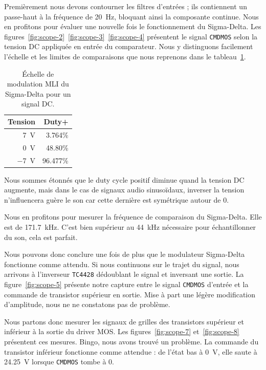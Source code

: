 \documentclass[10pt, oneside, a4paper]{article}
\begin{document}
Premièrement nous devons contourner les filtres d'entrées ; ils contiennent un passe-haut à la fréquence de \SI{20}{\hertz}, bloquant ainsi la composante continue.
Nous en profitons pour évaluer une nouvelle fois le fonctionnement du Sigma-Delta.
Les figures~\ref{fig:scope-2}~\ref{fig:scope-3}~\ref{fig:scope-4} présentent le signal \texttt{CMDMOS} selon la tension DC appliquée en entrée du comparateur.
Nous y distinguons facilement l'échelle et les limites de comparaisons que nous reprenons dans le tableau~\ref{tab:dutyCycleDC}.
\begin{table}[!ht]
    \centering
    \begin{tabular}{|r|r|}
    \hline
    Tension & Duty+ \\
    \hline
    \SI{7}{\volt}  & \num{3.764}\% \\
    \SI{0}{\volt}  & \num{48.80}\% \\
    \SI{-7}{\volt} & \num{96.477}\% \\
    \hline
    \end{tabular}
    \caption{Échelle de modulation MLI du Sigma-Delta pour un signal DC.}
    \label{tab:dutyCycleDC}
\end{table}
Nous sommes étonnés que le duty cycle positif diminue quand la tension DC augmente, mais dans le cas de signaux audio sinusoïdaux, inverser la tension n'influencera guère le son car cette dernière est symétrique autour de 0.

Nous en profitons pour mesurer la fréquence de comparaison du Sigma-Delta.
Elle est de \SI{171.7}{\kilo\hertz}.
C'est bien supérieur au \SI{44}{\kilo\hertz} nécessaire pour échantillonner du son, cela est parfait.

Nous pouvons donc conclure une fois de plus que le modulateur Sigma-Delta fonctionne comme attendu.
Si nous continuons sur le trajet du signal, nous arrivons à l'inverseur \texttt{TC4428} dédoublant le signal et inversant une sortie.
La figure~\ref{fig:scope-5} présente notre capture entre le signal \texttt{CMDMOS} d'entrée et la commande de transistor supérieur en sortie.
Mise à part une légère modification d'amplitude, nous ne ne constatons pas de problème.

Nous partons donc mesurer les signaux de grilles des transistors supérieur et inférieur à la sortie du driver MOS.
Les figures~\ref{fig:scope-7} et~\ref{fig:scope-8} présentent ces mesures.
Bingo, nous avons trouvé un problème.
La commande du transistor inférieur fonctionne comme attendue : de l'état bas à \SI{0}{\volt}, elle saute à \SI{24.25}{\volt} lorsque \texttt{CMDMOS} tombe à 0.
\end{document}
